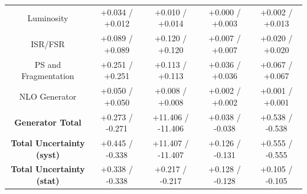 \begin{table}[htbp]
\begin{center}
\begin{tabular}{|c|c|c|c|c|}
   Luminosity                            &  +0.034   / +0.012   & +0.010   / +0.014   & +0.000   / +0.003   & +0.002   / +0.013   \\
   ISR/FSR                               &  +0.089   / +0.089   & +0.120   / +0.120   & +0.007   / +0.007   & +0.020   / +0.020   \\
   PS and Fragmentation                  &  +0.251   / +0.251   & +0.113   / +0.113   & +0.036   / +0.036   & +0.067   / +0.067   \\
   NLO Generator                         &  +0.050   / +0.050   & +0.008   / +0.008   & +0.002   / +0.002   & +0.001   / +0.001   \\
   \hline
   \textbf{Generator Total}              &  +0.273   / -0.271   & +11.406  / -11.406  & +0.038   / -0.038   & +0.538   / -0.538   \\
   \hline
   \hline
   \textbf{Total Uncertainty (syst)}     &  +0.445   / -0.338   & +11.407  / -11.407  & +0.126   / -0.131   & +0.555   / -0.555   \\
   \textbf{Total Uncertainty (stat)}     &  +0.338   / -0.338   & +0.217   / -0.217   & +0.128   / -0.128   & +0.105   / -0.105   \\
   \hline
   \end{tabular}
 
   \end{center}
 \end{table}
 



